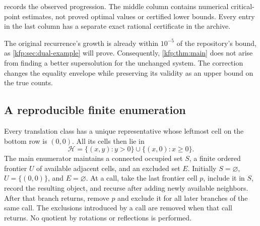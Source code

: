\documentclass[11pt,a4paper]{article}
\theoremstyle{definition}
\theoremstyle{remark}
\begin{document}
 records the observed progression. The middle column
contains numerical critical-point estimates, not proved optimal values or
certified lower bounds. Every entry in the last column has a separate
exact rational certificate in the archive.

\begin{table}[htbp]
\centering\small

\caption{Progress under exact-prefix correction. Numerical estimates and
rigorous upper certificates are deliberately separated.}
\label{kfp:tab:progress}
\end{table}

The original recurrence's growth is already within $10^{-5}$ of the
repository's bound, as \cref{kfp:sec:dual-example} will prove. Consequently,
\cref{kfp:thm:main} does not arise from finding a better supersolution for the
unchanged system. The correction changes the equality envelope while
preserving its validity as an upper bound on the true counts.

\subsection{A reproducible finite enumeration}
Every translation class has a unique representative whose leftmost cell on
the bottom row is $(0,0)$. All its cells then lie in
\[
 \mathcal H=\{(x,y):y>0\}\cup\{(x,0):x\geq0\}.
\]
The main enumerator maintains a connected occupied set $S$, a finite ordered
frontier $U$ of available adjacent cells, and an excluded set $E$.
Initially $S=\varnothing$, $U=\{(0,0)\}$, and $E=\varnothing$.
At a call, take the last frontier cell $p$, include it in $S$, record the
resulting object, and recurse after adding newly available neighbors.
After that branch returns, remove $p$ and exclude it for all later branches
of the same call. The exclusions introduced by a call are removed when that
call returns. No quotient by rotations or reflections is performed.
\end{document}
